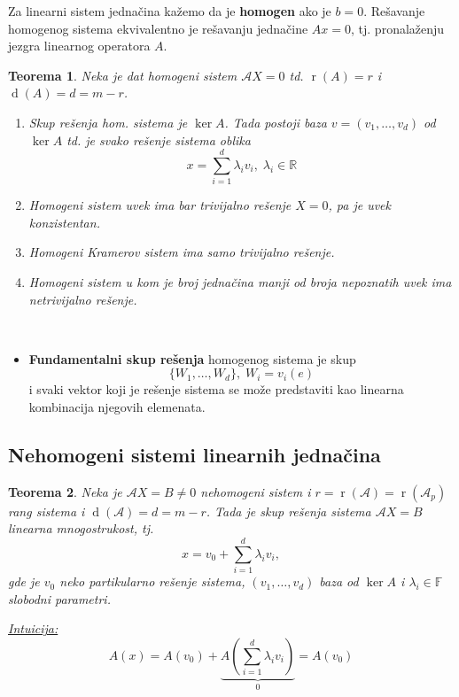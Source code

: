 \documentclass[a4paper,12pt,twoside]{report}
\newtheorem{theorem}{Teorema}[section]
\numberwithin{algorithm}{section}
\newcommand{\intuicija}{\noindent\underline{\textit{Intuicija:}}\ }
\begin{document}
Za linearni sistem jednačina kažemo da je \textbf{homogen} ako je $b = 0$. Rešavanje homogenog sistema ekvivalentno je rešavanju jednačine $Ax = 0$, tj. pronalaženju
jezgra linearnog operatora $A$.

\begin{theorem}
    Neka je dat homogeni sistem $\mathcal{A}X = 0$ td. $\operatorname{r}(A) = r$ i $\operatorname{d}(A) = d = m-r$.
    \begin{enumerate}
        \item Skup rešenja hom. sistema je $\ker A$. Tada postoji baza $v = (v_1, \dots, v_d)$ od $\ker A$ td. je svako rešenje sistema oblika
        \[ x = \sum_{i=1}^{d} \lambda_i v_i, \; \lambda_i \in \mathbb{R} \]
        \item Homogeni sistem uvek ima bar trivijalno rešenje $X = 0$, pa je uvek konzistentan.
        \item Homogeni Kramerov sistem ima samo trivijalno rešenje.
        \item Homogeni sistem u kom je broj jednačina manji od broja nepoznatih uvek ima netrivijalno rešenje.
    \end{enumerate}
\end{theorem}\

\begin{itemize}
    \item \textbf{Fundamentalni skup rešenja} homogenog sistema je skup
\[ \{ W_1, \dots, W_d \}, \; W_i = v_i(e) \] i svaki vektor koji je rešenje sistema se može predstaviti kao linearna kombinacija njegovih elemenata.
\end{itemize}
\newpage
\subsection{Nehomogeni sistemi linearnih jednačina}

\begin{theorem}
    Neka je $\mathcal{A}X = B \neq 0$ nehomogeni sistem i $r = \operatorname{r}(\mathcal{A}) = \operatorname{r}(\mathcal{A}_p)$ rang sistema i $\operatorname{d}(\mathcal{A})
    = d = m-r$. Tada je skup rešenja sistema $\mathcal{A}X = B$ linearna mnogostrukost, tj.
    \[ x = v_0 + \sum_{i=1}^{d} \lambda_i v_i, \] gde je $v_0$ neko partikularno rešenje sistema, $(v_1, \dots, v_d)$ baza od $\ker A$ i $\lambda_i \in \mathbb{F}$ slobodni
    parametri.
\end{theorem}

\intuicija \[ A(x) = A(v_0) + \underbrace{A \left(\sum_{i=1}^{d} \lambda_i v_i \right)}_0 = A(v_0) \]
\end{document}
